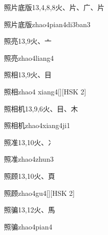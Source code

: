 \begin{entry}{照片底版}{13,4,8,8}{⽕、⽚、⼴、⽚}
  \begin{phonetics}{照片底版}{zhao4pian4di3ban3}
  \end{phonetics}
\end{entry}

\begin{entry}{照亮}{13,9}{⽕、⼇}
  \begin{phonetics}{照亮}{zhao4liang4}
  \end{phonetics}
\end{entry}

\begin{entry}{照相}{13,9}{⽕、⽬}
  \begin{phonetics}{照相}{zhao4 xiang4}[][HSK 2]
  \end{phonetics}
\end{entry}

\begin{entry}{照相机}{13,9,6}{⽕、⽬、⽊}
  \begin{phonetics}{照相机}{zhao4xiang4ji1}
  \end{phonetics}
\end{entry}

\begin{entry}{照准}{13,10}{⽕、⼎}
  \begin{phonetics}{照准}{zhao4zhun3}
  \end{phonetics}
\end{entry}

\begin{entry}{照顾}{13,10}{⽕、⾴}
  \begin{phonetics}{照顾}{zhao4gu4}[][HSK 2]
  \end{phonetics}
\end{entry}

\begin{entry}{照骗}{13,12}{⽕、⾺}
  \begin{phonetics}{照骗}{zhao4pian4}
  \end{phonetics}
\end{entry}

